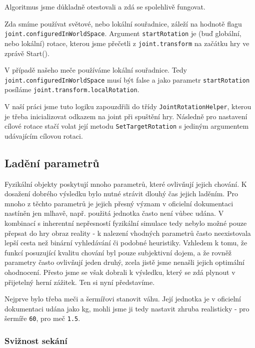 Algoritmus jsme důkladně otestovali a zdá se spolehlivě fungovat.

Zda smíme používat světové, nebo lokální souřadnice, záleží na hodnotě flagu \texttt{joint.configuredInWorldSpace}. Argument \texttt{startRotation} je (buď globální, nebo lokální) rotace, kterou jsme přečetli z \texttt{joint.transform} na začátku hry ve zprávě Start().

V případě našeho meče používáme lokální souřadnice. Tedy \texttt{joint.configuredInWorldSpace} musí být false a jako parametr \texttt{startRotation} posíláme \texttt{joint.transform.localRotation}.

V naší práci jsme tuto logiku zapouzdřili do třídy \texttt{JointRotationHelper}, kterou je třeba inicializovat odkazem na joint při spuštění hry. Následně pro nastavení cílové rotace stačí volat její metodu \texttt{SetTargetRotation} s jediným argumentem udávajícím cílovou rotaci.


\subsection{Ladění parametrů} \label{swordParameterTweaksSection}

Fyzikální objekty poskytují mnoho parametrů, které ovlivňují jejich chování. K dosažení dobrého výsledku bylo nutné strávit dlouhý čas jejich laděním. Pro mnoho z těchto parametrů je jejich přesný význam v oficielní dokumentaci nastíněn jen mlhavě, např. použitá jednotka často není vůbec udána. V kombinací s inherentní nepřesností fyzikální simulace tedy nebylo možné pouze přepsat do hry obraz reality - k nalezení vhodných parametrů často neexistovala lepší cesta než binární vyhledávání či podobné heuristiky. Vzhledem k tomu, že funkcí posuzující kvalitu chování byl pouze subjektivní dojem, a že rovněž parametry často ovlivňují jeden druhý, zcela jistě jsme nenašli jejich optimální ohodnocení. Přesto jsme se však dobrali k výsledku, který se zdá plynout v přijetelný herní zážitek. Ten si nyní představíme.

\bigbreak
Nejprve bylo třeba meči a šermířovi stanovit váhu. Její jednotka je v oficielní dokumentaci udána jako kg, mohli jsme ji tedy nastavit zhruba realisticky - pro šermíře \texttt{60}, pro meč \texttt{1.5}.

\subsubsection*{Svižnost sekání}

